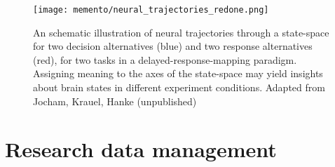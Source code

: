 


\begin{figure}
	\centering
	\texttt{[image: memento/neural\_trajectories\_redone.png]}
	\caption[Neural trajectories through state-spaces]{An schematic illustration of neural trajectories through a state-space for two decision alternatives (blue) and two response alternatives (red), for two tasks in a delayed-response-mapping paradigm. Assigning meaning to the axes of the state-space may yield insights about brain states in different experiment conditions. Adapted from Jocham, Krauel, Hanke (unpublished)}
	\label{fig:trajectories}
\end{figure}






\section{Research data management}
\label{chap:k1-rdm}

